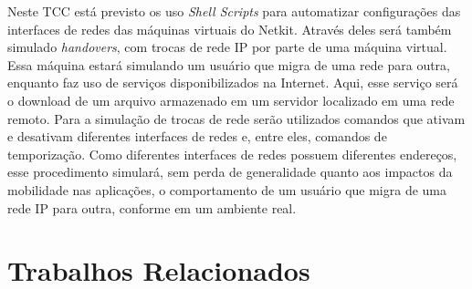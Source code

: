 \documentclass[	12pt, Times, openright, twoside, a4paper, english, brazil]{abntex2}
\begin{document}


Neste TCC está previsto os uso \textit{Shell Scripts} para automatizar configurações das interfaces de redes das máquinas virtuais do Netkit. Através deles será também simulado \textit{handovers}, com trocas de rede IP por parte de uma máquina virtual. Essa máquina estará simulando um usuário que migra de uma rede para outra, enquanto faz uso de serviços disponibilizados na Internet. Aqui, esse serviço será o download de um arquivo armazenado em um servidor localizado em uma rede remoto. Para a simulação de trocas de rede serão utilizados comandos que ativam e desativam diferentes interfaces de redes e, entre eles, comandos de temporização. Como diferentes interfaces de redes possuem diferentes endereços, esse procedimento simulará, sem perda de generalidade quanto aos impactos da mobilidade nas aplicações, o comportamento de um usuário que migra de uma rede IP para outra, conforme em um ambiente real.


\section{Trabalhos Relacionados}

\end{document}
